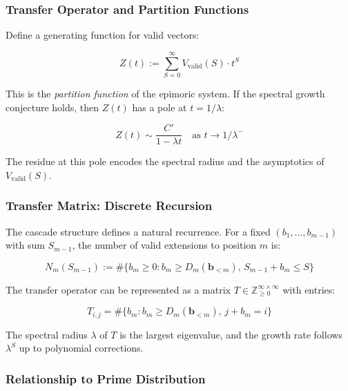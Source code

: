 \subsubsection{Transfer Operator and Partition Functions}

Define a generating function for valid vectors:

\begin{equation}
Z(t) := \sum_{S=0}^{\infty} V_{\text{valid}}(S) \cdot t^S
\end{equation}

This is the \emph{partition function} of the epimoric system. If the spectral growth conjecture holds, then $Z(t)$ has a pole at $t = 1/\lambda$:

\begin{equation}
Z(t) \sim \frac{C'}{1 - \lambda t} \quad \text{as } t \to 1/\lambda^-
\end{equation}

The residue at this pole encodes the spectral radius and the asymptotics of $V_{\text{valid}}(S)$.

\subsubsection{Transfer Matrix: Discrete Recursion}

The cascade structure defines a natural recurrence. For a fixed $(b_1, \ldots, b_{m-1})$ with sum $S_{m-1}$, the number of valid extensions to position $m$ is:

\begin{equation}
N_m(S_{m-1}) := \#\{b_m \geq 0 : b_m \geq D_m(\mathbf{b}_{<m}), \, S_{m-1} + b_m \leq S\}
\end{equation}

The transfer operator can be represented as a matrix $T \in \mathbb{Z}_{\geq 0}^{\infty \times \infty}$ with entries:

\begin{equation}
T_{i,j} = \#\{b_m : b_m \geq D_m(\mathbf{b}_{<m}), \, j + b_m = i\}
\end{equation}

The spectral radius $\lambda$ of $T$ is the largest eigenvalue, and the growth rate follows $\lambda^S$ up to polynomial corrections.

\subsubsection{Relationship to Prime Distribution}

